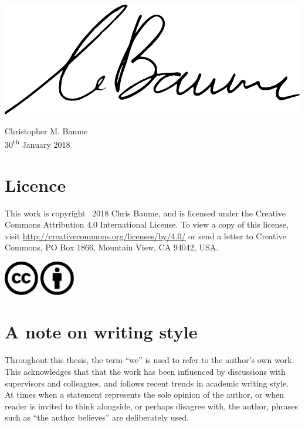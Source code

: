 \documentclass[11pt,a4paper,twoside,openany]{book}
\begin{document}
\vspace{1cm}
\hfill
\includegraphics[width=.3\textwidth]{figs/signature}
\begin{flushright}
Christopher M. Baume\\
30\textsuperscript{th} January 2018
\end{flushright}



\chapter*{Licence}
This work is copyright \textcopyright~2018 Chris Baume, and is licensed under the Creative Commons Attribution 4.0
International License. To view a copy of this license, visit \url{http://creativecommons.org/licenses/by/4.0/} or send
a letter to Creative Commons, PO Box 1866, Mountain View, CA 94042, USA.

\vspace{1cm}
\begin{center}
\includegraphics[width=1.5cm]{figs/cc}
\includegraphics[width=1.5cm]{figs/by}
\end{center}

\tableofcontents

\listoffigures

\listoftables





\chapter*{A note on writing style}
Throughout this thesis, the term ``we'' is used to refer to the author's own work. This acknowledges that that the work
has been influenced by discussions with supervisors and colleagues, and follows recent trends in academic writing
style.  At times when a statement represents the sole opinion of the author, or when reader is invited to think
alongside, or perhaps disagree with, the author, phrases such as ``the author believes'' are deliberately used.
\end{document}
